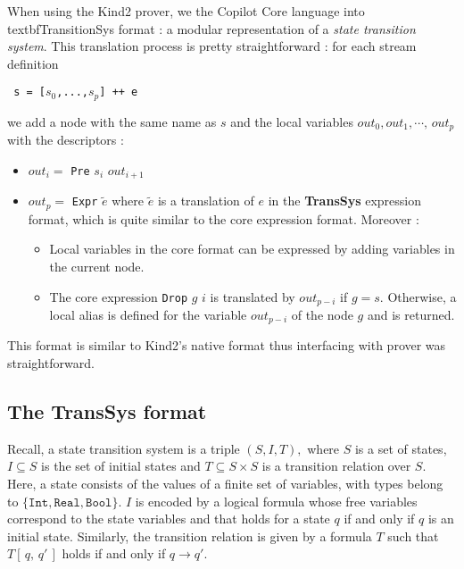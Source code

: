 When using the Kind2 prover, we the Copilot Core
language into   textbf{TransitionSys} format : a modular
representation of a \emph{state transition system}. This translation process is pretty straightforward : for each stream definition
\begin{center}\texttt{ s = [$s_0$,...,$s_p$] ++ e}\end{center}
we add a node with the same name as $s$ and the local variables $out_0, out_1, \cdots, \, out_p$ with the descriptors :

\begin{itemize}
\item $out_{i} = $  \texttt{Pre} $s_i$  $out_{i + 1}$
\item $out_{p} = $  \texttt{Expr} $\tilde e$  where $\tilde e$ is a translation of $e$ in the \textbf{TransSys} expression format, which is quite similar to the core expression format. Moreover :

\begin{itemize}
\item Local variables in the core format can be expressed by adding variables in the current node.
\item The core expression \texttt{Drop} $g$ $i$ is translated by $out_{p - i}$ if $g = s$. Otherwise, a local alias is defined for the variable $out_{p - i}$ of the node $g$ and is returned.
\end{itemize}

\end{itemize}
This format  is similar
to Kind2's native format thus interfacing with prover was
straightforward. 



\subsection{The \textbf{TransSys} format}

Recall, a state transition system is a triple $(S,I,T),$
where $S$ is a set of states, $I \subseteq S$ is the set of initial
states and $T \subseteq S \times S $ is a transition relation over $S$.
Here, a state consists of  the values of a finite set of variables, with types belong to $\{ \texttt{Int}, \texttt{Real},  \texttt{Bool}\}$. $I$ is encoded by a logical formula whose free variables correspond to the state variables and that holds for a state $q$ if and only if $q$ is an initial state. Similarly, the transition relation is given by a formula $T$ such that $T\left[\, q, \, q' \,\right]$ holds if and only if $q \rightarrow q'$. 

